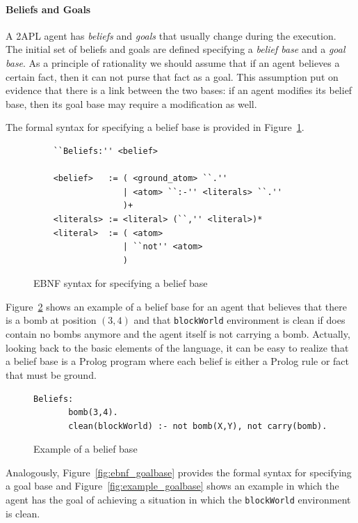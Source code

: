 \documentclass[a4paper]{article}
\begin{document}
\paragraph{Beliefs and Goals}

A 2APL agent has \emph{beliefs} and \emph{goals} that usually change during the execution. The initial set of beliefs and goals are defined specifying a \emph{belief base} and a \emph{goal base}. As a principle of rationality we should assume that if an agent believes a certain fact, then it can not purse that fact as a goal. This assumption put on evidence that there is a link between the two bases: if an agent modifies its belief base, then its goal base may require a modification as well. 

The formal syntax for specifying a belief base is provided in Figure~\ref{fig:ebnf_beliefbase}. 

\begin{figure}[htp]
\begin{verbatim}
	``Beliefs:'' <belief>
	
	<belief>   := ( <ground_atom> ``.''
	              | <atom> ``:-'' <literals> ``.'' 
	              )+
	<literals> := <literal> (``,'' <literal>)*
	<literal>  := ( <atom> 
	              | ``not'' <atom>
	              )
	\end{verbatim}
\caption{EBNF syntax for specifying a belief base}
\label{fig:ebnf_beliefbase}
\end{figure}

Figure~\ref{fig:example_beliefbase} shows an example of a belief base for an agent that believes that there is a bomb at position $(3,4)$ and that \texttt{blockWorld} environment is clean if does contain no bombs anymore and the agent itself is not carrying a bomb. Actually, looking back to the basic elements of the language, it can be easy to realize that a belief base is a Prolog program where each belief is either a Prolog rule or fact that must be ground.

\begin{figure}[htp]
\begin{verbatim}
Beliefs:
       bomb(3,4).
       clean(blockWorld) :- not bomb(X,Y), not carry(bomb).
\end{verbatim}
\caption{Example of a belief base}
\label{fig:example_beliefbase}
\end{figure}

Analogously, Figure~\ref{fig:ebnf_goalbase} provides the formal syntax for specifying a goal base and Figure~\ref{fig:example_goalbase} shows an example in which the agent has the goal of achieving a situation in which the \texttt{blockWorld} environment is clean. %
\end{document}
